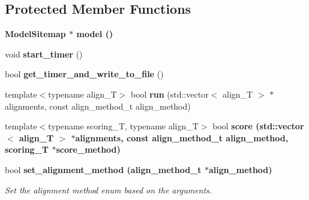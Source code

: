 \subsection*{Protected Member Functions}
\begin{CompactItemize}
\item 
\bf{Model\-Sitemap} $\ast$ \textbf{model} ()\label{classASCbase_1_1Search_8943627120b7578d1d37ad37c319e5b9}

\item 
void \textbf{start\_\-timer} ()\label{classASCbase_1_1Search_5bb9e31b72d314730373b33c2a602cc4}

\item 
bool \textbf{get\_\-timer\_\-and\_\-write\_\-to\_\-file} ()\label{classASCbase_1_1Search_54f6cd281b8ba0c9760a57c6d1b7f2c1}

\item 
template$<$typename align\_\-T$>$ bool \textbf{run} (std::vector$<$ align\_\-T $>$ $\ast$alignments, const align\_\-method\_\-t align\_\-method)\label{classASCbase_1_1Search_221ce8b930daf65916a915436fc44254}

\item 
template$<$typename scoring\_\-T, typename align\_\-T$>$ bool \bf{score} (std::vector$<$ align\_\-T $>$ $\ast$alignments, const align\_\-method\_\-t align\_\-method, scoring\_\-T $\ast$score\_\-method)
\item 
bool \bf{set\_\-alignment\_\-method} (align\_\-method\_\-t $\ast$align\_\-method)\label{classASCbase_1_1Search_8d8972c7e6cab00f3251285af696d902}

\begin{CompactList}\small\item\em Set the alignment method enum based on the arguments. \item\end{CompactList}\end{CompactItemize}
